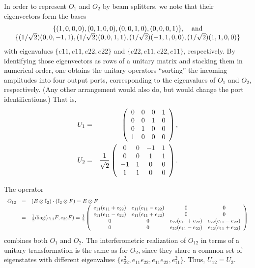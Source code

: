 \documentclass[pra,showpacs,showkeys,amsfonts]{revtex4}
\begin{document}
In order to represent $O_1$ and $O_2$ by beam splitters,
we note that their eigenvectors form the bases
\begin{equation}
\begin{array}{c}
\{(1, 0, 0, 0), (0, 1, 0, 0), (0, 0, 1, 0),  (0, 0, 0, 1)\},\quad {\rm and}\\
\{(1/ \sqrt{2})(0, 0, -1, 1),(1/ \sqrt{2})(0, 0, 1, 1),  (1/ \sqrt{2})(-1, 1, 0, 0), (1/ \sqrt{2})(1, 1, 0, 0)\}
\end{array}
\end{equation}
with eigenvalues
$\{e11, e11, e22, e22\}$
and
$\{e22, e11, e22, e11\}$, respectively.
By identifying those eigenvectors as rows of a unitary
matrix and stacking them in numerical order, one obtains the
unitary operators ``sorting'' the incoming
amplitudes into four output ports, corresponding to the eigenvalues
of $O_1$ and $O_2$, respectively.
(Any other arrangement would also do, but would change the port identifications.)
That is,
\begin{eqnarray}
U_1 & = &
\left(
\begin{array}{cccc}
0&0&0&1\\
0&0&1&0\\
0&1&0&0\\
1&0&0&0
\end{array}
\right)
,    \label{2004-analog-ea1}
\\
U_2 & = & {1\over  \sqrt{2}}
\left(
\begin{array}{cccc}
0& 0& -1& 1\\
0& 0& 1& 1\\
-1& 1& 0& 0    \\
1& 1& 0& 0
\end{array}
\right)   \label{2004-analog-ea2}
.
\end{eqnarray}

The operator
\begin{equation}
\begin{array}{lll}
O_{12}&=&(E\otimes {\Bbb I}_2)\cdot ({\Bbb I}_2\otimes F)
=E\otimes F \\
&=&
{1\over {2}}
{\rm diag}(e_{11} F, e_{22} F) =
{1\over  {2}}
\left(
\begin{array}{cccc}
e_{11} (e_{11} + e_{22})& e_{11} (e_{11} - e_{22})& 0& 0\\
e_{11} (e_{11} - e_{22})& e_{11} (e_{11} + e_{22})& 0& 0\\
0& 0& e_{22} (e_{11} + e_{22})&  e_{22}(e_{11} - e_{22})\\
0& 0&  e_{22}(e_{11} - e_{22})& e_{22} (e_{11} + e_{22})
\end{array}
\right)
\end{array} \label{2004-analog-u12}
\end{equation}
combines both $O_1$ and $O_2$.
The interferometric realization of $O_{12}$ in terms of a unitary transformation
is the same as for $O_2$, since they share a common set of eigenstates
with different eigenvalues
$\{e_{22}^2,  e_{11} e_{22},  e_{11} e_{22},  e_{11}^2\}$. Thus,
$U_{12} =U_2$.
\end{document}
